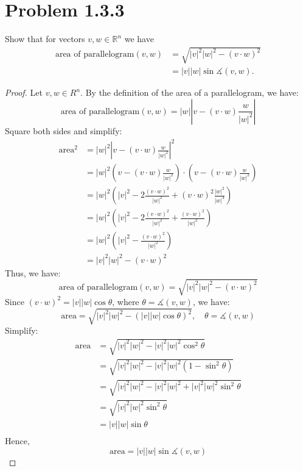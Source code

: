 \documentclass[12pt]{article}
\newcommand{\RR}{\mathbb{R}}
\newcommand\abs[1]{\left| #1 \right|}
\newcommand\parens[1]{\left( #1 \right)}
\newcommand\solproof[1]{\begin{mdframed}
\begin{proof} #1
\end{proof}
\end{mdframed}}
\begin{document}
\section*{Problem 1.3.3}
Show that for vectors $v, w \in \RR^n$ we have
\begin{align*}
    \text{area of parallelogram}\parens{v,w} &= \sqrt{\abs{v}^2\abs{w}^2 - \parens{v \cdot w}^2} \\
    &= \abs{v}\abs{w} \sin \measuredangle \parens{v,w}.
\end{align*}

\solproof{
    Let $v, w \in R^n$. By the definition of the area of a parallelogram, we have:
    \[\text{area of parallelogram}\parens{v,w} = \abs{w}\abs{v - \parens{v \cdot w} \frac{w}{\abs{w}^2}}\]
    Square both sides and simplify:
    \begin{align*}
        \text{area}^2 &= \abs{w}^2 \abs{v - \parens{v \cdot w} \frac{w}{\abs{w}^2}}^2 \\
        &= \abs{w}^2 \parens{v - \parens{v \cdot w} \frac{w}{\abs{w}^2}} \cdot \parens{v - \parens{v \cdot w} \frac{w}{\abs{w}^2}} \\
        &= \abs{w}^2 \parens{\abs{v}^2 - 2 \frac{\parens{v \cdot w}^2}{\abs{w}^2} + \parens{v \cdot w}^2 \frac{\abs{w}^2}{\abs{w}^4}} \\
        &= \abs{w}^2 \parens{\abs{v}^2 - 2 \frac{\parens{v \cdot w}^2}{\abs{w}^2} + \frac{\parens{v \cdot w}^2}{\abs{w}^2}} \\
        &= \abs{w}^2 \parens{\abs{v}^2 - \frac{\parens{v \cdot w}^2}{\abs{w}^2}} \\
        &= \abs{v}^2 \abs{w}^2 - \parens{v \cdot w}^2
    \end{align*}
    Thus, we have:
    \[\boxed{\text{area of parallelogram}\parens{v,w} = \sqrt{\abs{v}^2\abs{w}^2 - \parens{v \cdot w}^2}}\]
    Since $(v \cdot w)^2 = \abs{v}\abs{w}\cos\theta$, where $\theta = \measuredangle\parens{v,w}$, we have:
    \[\text{area} = \sqrt{|v|^2|w|^2 - (\abs{v}\abs{w}\cos\theta)^2}, \quad \theta = \measuredangle\parens{v,w}\]
    Simplify:
    \begin{align*}
        \text{area} &= \sqrt{\abs{v}^2\abs{w}^2 - \abs{v}^2\abs{w}^2\cos^2\theta} \\
        &= \sqrt{\abs{v}^2\abs{w}^2 - \abs{v}^2\abs{w}^2\parens{1 - \sin^2\theta}} \\
        &= \sqrt{\abs{v}^2\abs{w}^2 - \abs{v}^2\abs{w}^2 + \abs{v}^2\abs{w}^2\sin^2\theta} \\
        &= \sqrt{\abs{v}^2\abs{w}^2\sin^2\theta} \\
        &= \abs{v}\abs{w}\sin\theta \\
    \end{align*}
    Hence,
    \[\boxed{\text{area} = \abs{v}\abs{w}\sin \measuredangle\parens{v, w}}\]
}
\end{document}
